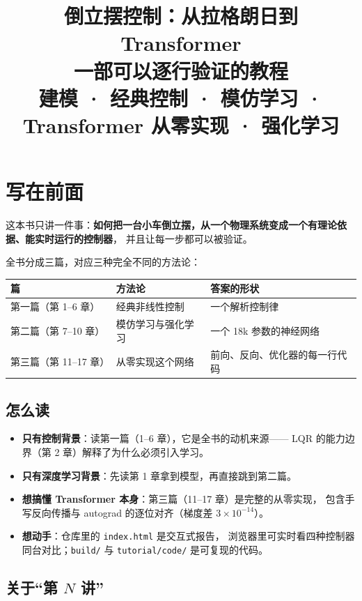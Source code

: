 \documentclass[UTF8,11pt,openany]{ctexbook}
\title{\bfseries 倒立摆控制：从拉格朗日到 Transformer\\[8pt]
       \large 一部可以逐行验证的教程\\[4pt]
       \normalsize 建模 · 经典控制 · 模仿学习 · Transformer 从零实现 · 强化学习}
\author{}
\date{}
\begin{document}
\frontmatter
\maketitle

\chapter*{写在前面}

这本书只讲一件事：\textbf{如何把一台小车倒立摆，从一个物理系统变成一个有理论依据、能实时运行的控制器}，
并且让每一步都可以被验证。

全书分成三篇，对应三种完全不同的方法论：

\begin{center}\small
\begin{tabular}{@{}lll@{}}
\toprule
篇 & 方法论 & 答案的形状 \\
\midrule
第一篇（第 1--6 章） & 经典非线性控制 & 一个解析控制律 \\
第二篇（第 7--10 章） & 模仿学习与强化学习 & 一个 18k 参数的神经网络 \\
第三篇（第 11--17 章） & 从零实现这个网络 & 前向、反向、优化器的每一行代码 \\
\bottomrule
\end{tabular}
\end{center}

\section*{怎么读}

\begin{itemize}[leftmargin=1.6em,itemsep=3pt]
  \item \textbf{只有控制背景}：读第一篇（1--6 章），它是全书的动机来源——
        LQR 的能力边界（第 2 章）解释了为什么必须引入学习。
  \item \textbf{只有深度学习背景}：先读第 1 章拿到模型，再直接跳到第二篇。
  \item \textbf{想搞懂 Transformer 本身}：第三篇（11--17 章）是完整的从零实现，
        包含手写反向传播与 autograd 的逐位对齐（梯度差 $3\times10^{-14}$）。
  \item \textbf{想动手}：仓库里的 \texttt{index.html} 是交互式报告，
        浏览器里可实时看四种控制器同台对比；\texttt{build/} 与 \texttt{tutorial/code/}
        是可复现的代码。
\end{itemize}

\section*{关于“第 $N$ 讲”}
\end{document}
